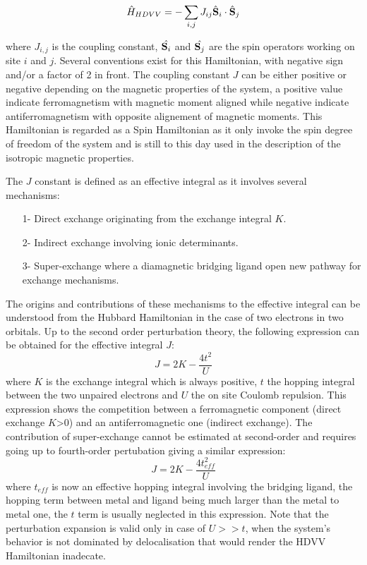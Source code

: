\documentclass[10pt]{report}
\numberwithin{equation}{section}
\begin{document}
\begin{equation}\label{Hheis}
    \hat{H}_{HDVV}=-\sum_{i,j} J_{ij} \hat{\vb S}_i \cdot \hat{\vb S}_j
\end{equation}

where $J_{i,j}$ is the coupling constant, $\hat{\vb S_i}$ and $\hat{\vb S_j}$ are the spin operators working on site $i$ and $j$.
Several conventions exist for this Hamiltonian, with negative sign and/or a factor of 2 in front.  
The coupling constant $J$ can be either positive or negative depending on the magnetic properties of the system, a positive value indicate ferromagnetism with magnetic moment aligned while negative indicate antiferromagnetism with opposite alignement of magnetic moments.
This Hamiltonian is regarded as a Spin Hamiltonian as it only invoke the spin degree of freedom of the system and is still to this day used in the description of the isotropic magnetic properties.

The $J$ constant is defined as an effective integral as it involves several mechanisms:
\begin{itemize}
    \item[1-] Direct exchange originating from the exchange integral $K$.
    \item[2-] Indirect exchange involving ionic determinants.
    \item[3-] Super-exchange where a diamagnetic bridging ligand open new pathway for exchange mechanisms.
\end{itemize}

The origins and contributions of these mechanisms to the effective integral can be understood from the Hubbard Hamiltonian in the case of two electrons in two orbitals.
Up to the second order perturbation theory, the following expression can be obtained for the effective integral $J$:
\begin{equation}
    J=2K-\frac{4t^2}{U}
\end{equation}
where $K$ is the exchange integral which is always positive, $t$ the hopping integral between the two unpaired electrons and $U$ the on site Coulomb repulsion.
This expression shows the competition between a ferromagnetic component (direct exchange $K$>0) and an antiferromagnetic one (indirect exchange).
The contribution of super-exchange cannot be estimated at second-order and requires going up to fourth-order pertubation giving a similar expression:
\begin{equation}
    J=2K-\frac{4t_{eff}^2}{U}
\end{equation}
where $t_{eff}$ is now an effective hopping integral involving the bridging ligand, the hopping term between metal and ligand being much larger than the metal to metal one, the $t$ term is usually neglected in this expression.
Note that the perturbation expansion is valid only in case of $U>>t$, when the system's behavior is not dominated by delocalisation that would render the HDVV Hamiltonian inadecate.
\end{document}
